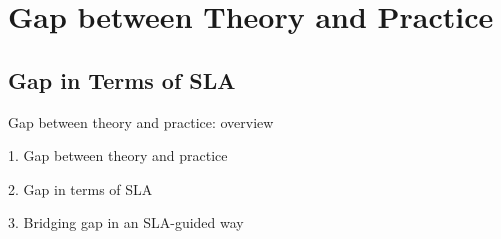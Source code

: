 \documentclass{beamer}
\begin{document}
\section{Gap between Theory and Practice}

\subsection{Gap in Terms of SLA}

\begin{frame}{Gap between theory and practice: overview}
  \begin{block}{1. Gap between theory and practice}
  \end{block}

  \begin{block}{2. Gap in terms of SLA}
  \end{block}

  \begin{block}{3. Bridging gap in an SLA-guided way}
  \end{block}
\end{frame}
\end{document}
